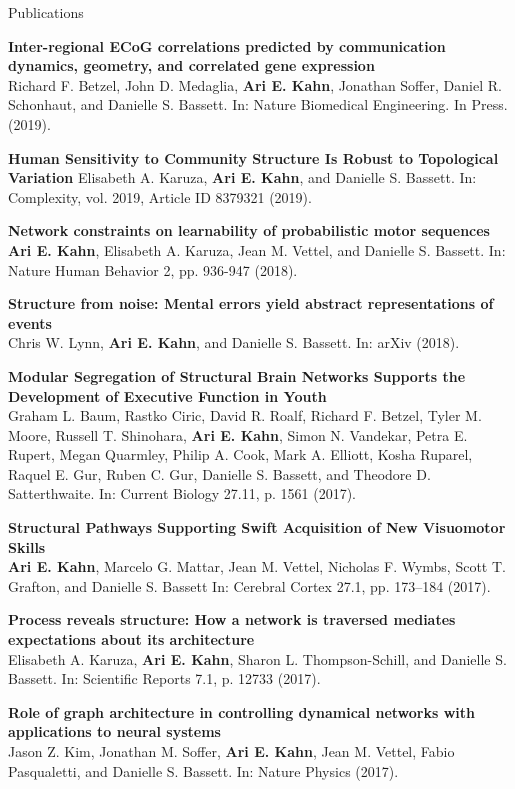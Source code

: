 \documentclass{resume} %
\begin{document}
\begin{rSection}{Publications}

\textbf{Inter-regional ECoG correlations predicted by communication dynamics, geometry, and correlated gene expression} \\
Richard F. Betzel, John D. Medaglia, \textbf{Ari E. Kahn}, Jonathan Soffer, Daniel R. Schonhaut, and Danielle S. Bassett. In: Nature Biomedical Engineering. In Press. (2019).

    \textbf{Human Sensitivity to Community Structure Is Robust to Topological Variation}
    Elisabeth A. Karuza, \textbf{Ari E. Kahn}, and Danielle S. Bassett. In: Complexity, vol. 2019, Article ID 8379321 (2019).

\textbf{Network constraints on learnability of probabilistic motor sequences} \\
\textbf{Ari E. Kahn}, Elisabeth A. Karuza, Jean M. Vettel, and Danielle S. Bassett. In: Nature Human Behavior 2, pp. 936-947 (2018).

\textbf{Structure from noise: Mental errors yield abstract representations of events} \\
Chris W. Lynn, \textbf{Ari E. Kahn}, and Danielle S. Bassett. In: arXiv (2018).


\textbf{Modular Segregation of Structural Brain Networks Supports the Development of Executive Function in Youth} \\
Graham L. Baum, Rastko Ciric, David R. Roalf, Richard F. Betzel, Tyler M. Moore, Russell T. Shinohara, \textbf{Ari E. Kahn}, Simon N. Vandekar, Petra E. Rupert, Megan Quarmley, Philip A. Cook, Mark A. Elliott, Kosha Ruparel, Raquel E. Gur, Ruben C. Gur, Danielle S. Bassett, and Theodore D. Satterthwaite. In: Current Biology 27.11, p. 1561 (2017).

\textbf{Structural Pathways Supporting Swift Acquisition of New Visuomotor Skills} \\
\textbf{Ari E. Kahn}, Marcelo G. Mattar, Jean M. Vettel, Nicholas F. Wymbs, Scott T. Grafton, and Danielle S. Bassett In: Cerebral Cortex 27.1, pp. 173–184 (2017).

\textbf{Process reveals structure: How a network is traversed mediates expectations about its architecture} \\
Elisabeth A. Karuza, \textbf{Ari E. Kahn}, Sharon L. Thompson-Schill, and Danielle S. Bassett. In: Scientific Reports 7.1, p. 12733 (2017).

\textbf{Role of graph architecture in controlling dynamical networks with applications to neural systems} \\
Jason Z. Kim, Jonathan M. Soffer, \textbf{Ari E. Kahn}, Jean M. Vettel, Fabio Pasqualetti, and Danielle S. Bassett. In: Nature Physics (2017).


\end{rSection}
\end{document}
